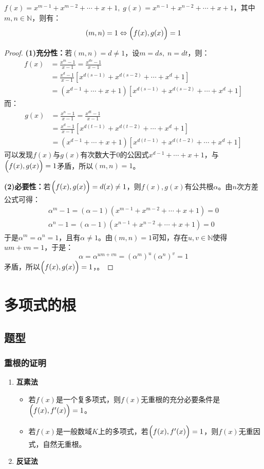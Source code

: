 \begin{theorem}
	$f(x)=x^{m-1}+x^{m-2}+\cdots+x+1,\;g(x)=x^{n-1}+x^{n-2}+\cdots+x+1$，其中$m,n\in\mathbb{N}$，则有：
	\begin{equation*}
		(m,n)=1\Leftrightarrow\Bigl(f(x),g(x)\Bigr)=1
	\end{equation*}
\end{theorem}
\begin{proof}
	\textbf{(1)充分性：}若$(m,n)=d\ne1$，设$m=ds,\;n=dt$，则：
	\begin{align*}
		f(x)
		&=\frac{x^m-1}{x-1}=\frac{x^{ds}-1}{x-1} \\
		&=\frac{x^d-1}{x-1}[x^{d(s-1)}+x^{d(s-2)}+\cdots+x^d+1] \\
		&=(x^{d-1}+\cdots+x+1)[x^{d(s-1)}+x^{d(s-2)}+\cdots+x^d+1]
	\end{align*}
	而：
	\begin{align*}
		g(x)
		&=\frac{x^n-1}{x-1}=\frac{x^{dt}-1}{x-1} \\
		&=\frac{x^d-1}{x-1}[x^{d(t-1)}+x^{d(t-2)}+\cdots+x^d+1] \\
		&=(x^{d-1}+\cdots+x+1)[x^{d(t-1)}+x^{d(t-2)}+\cdots+x^d+1]
	\end{align*}
	可以发现$f(x)$与$g(x)$有次数大于$0$的公因式$x^{d-1}+\cdots+x+1$，与$\Bigl(f(x),g(x)\Bigr)=1$矛盾，所以$(m,n)=1$。\par
	\textbf{(2)必要性：}若$\Bigl(f(x),g(x)\Bigr)=d(x)\ne1$，则$f(x),g(x)$有公共根$\alpha$。由$n$次方差公式可得：
	\begin{gather*}
		\alpha^m-1=(\alpha-1)(x^{m-1}+x^{m-2}+\cdots+x+1)=0 \\
		\alpha^n-1=(\alpha-1)(x^{n-1}+x^{n-2}+\cdots+x+1)=0
	\end{gather*}
	于是$\alpha^m=\alpha^n=1$，且有$\alpha\ne1$。由$(m,n)=1$可知，存在$u,v\in\mathbb{N}$使得$um+vn=1$，于是：
	\begin{equation*}
		\alpha=\alpha^{um+vn}=(\alpha^m)^u(\alpha^n)^v=1
	\end{equation*}
	矛盾，所以$\Bigl(f(x),g(x)\Bigr)=1$，。
\end{proof}

\section{多项式的根}
\subsection{题型}
\subsubsection{重根的证明}
\begin{enumerate}
	\item \textbf{互素法}
	\begin{itemize}
		\item 若$f(x)$是一个复多项式，则$f(x)$无重根的充分必要条件是$\Bigl(f(x),f'(x)\Bigr)=1$。
		\item 若$f(x)$是一般数域$K$上的多项式，若$\Bigl(f(x),f'(x)\Bigr)=1$，则$f(x)$无重因式，自然无重根。
	\end{itemize}
	\item \textbf{反证法}
\end{enumerate}

